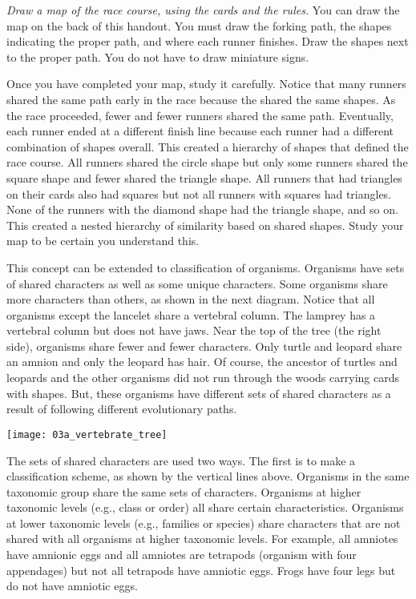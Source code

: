 \documentclass[12pt, hidelinks]{exam}
\begin{document}
\emph{Draw a map of the race course, using the cards and the rules.}  You can draw the map on the back of this handout. You must draw the forking path, the shapes indicating the proper path, and where each runner finishes. Draw the shapes next to the proper path. You do not have to draw miniature signs. \vspace*{1\baselineskip}

Once you have completed your map, study it carefully. Notice that many runners shared the same path early in the race because the shared the same shapes. As the race proceeded, fewer and fewer runners shared the same path. Eventually, each runner ended at a different finish line because each runner had a different combination of shapes overall. This created a hierarchy of shapes that defined the race course. All runners shared the circle shape but only some runners shared the square shape and fewer shared the triangle shape.  All runners that had triangles on their cards also had squares but not all runners with squares had triangles.  None of the runners with the diamond shape had the triangle shape, and so on.  This created a nested hierarchy of similarity based on shared shapes. Study your map to be certain you understand this. 

This concept can be extended to classification of organisms. Organisms have sets of shared characters as well as some unique characters. Some organisms share more characters than others, as shown in the next diagram. Notice that all organisms except the lancelet share a vertebral column. The lamprey has a vertebral column but does not have jaws. Near the top of the tree (the right side), organisms share fewer and fewer characters. Only turtle and leopard share an amnion and only the leopard has hair.  Of course, the ancestor of turtles and leopards and the other organisms did not run through the woods carrying cards with shapes. But, these organisms have different sets of shared characters as a result of following different evolutionary paths.

\begin{center}
	\texttt{[image: 03a\_vertebrate\_tree]}
\end{center}

The sets of shared characters are used two ways. The first is to make a classification scheme, as shown by the vertical lines above. Organisms in the same taxonomic group share the same sets of characters. Organisms at higher taxonomic levels (e.g., class or order) all share certain characteristics. Organisms at lower taxonomic levels (e.g., families or species) share characters that are not shared with all organisms at higher taxonomic levels. For example, all amniotes have amnionic eggs and all amniotes are tetrapods (organism with four appendages) but not all tetrapods have amniotic eggs. Frogs have four legs but do not have amniotic eggs.
\end{document}
